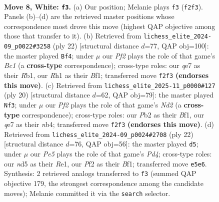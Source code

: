 \documentclass[11pt]{article}
\begin{document}
\begin{figure}[p]\centering
\begin{subfigure}{0.46\textwidth}\centering
\resizebox{\linewidth}{!}{%
\newchessgame
\chessboard[
  setfen={r1b1kb1r/p1ppqppp/2p5/3nP3/8/8/PPP1QPPP/RNB1KB1R w KQkq - 3 8},
  showmover=false,
  pgfstyle=straightmove, color=movearrow, markmove={f2-f3}
]}
\caption{}
\end{subfigure}\hfill
\begin{subfigure}{0.46\textwidth}\centering
\resizebox{\linewidth}{!}{%
\newchessgame
\chessboard[
  setfen={1r2kb1r/pb1pqppp/2n5/2ppP3/8/2P2N2/P1P1QPPP/1RB1KB1R w Kk - 3 12},
  showmover=false,
  pgfstyle=straightmove, color=movearrow, markmove={c1-f4}
]}
\caption{}
\end{subfigure}
\\[4pt]
\begin{subfigure}{0.46\textwidth}\centering
\resizebox{\linewidth}{!}{%
\newchessgame
\chessboard[
  setfen={r1b1kb1r/2ppqppp/2p5/4P3/pnP4P/8/PP1NQPP1/R1B1KB1R w KQkq - 1 11},
  showmover=false,
  pgfstyle=straightmove, color=movearrow, markmove={d2-f3}
]}
\caption{}
\end{subfigure}\hfill
\begin{subfigure}{0.46\textwidth}\centering
\resizebox{\linewidth}{!}{%
\newchessgame
\chessboard[
  setfen={r1bq1rk1/pp1p1ppp/2p2b2/5n2/3P4/2N5/PPP2PPP/R1BQRBK1 w - - 1 12},
  showmover=false,
  pgfstyle=straightmove, color=movearrow, markmove={d4-d5}
]}
\caption{}
\end{subfigure}
\caption{\textbf{Move 8, White: \texttt{f3}.} (a) Our position; Melanie plays \texttt{f3} (\texttt{f2f3}). Panels (b)--(d) are the retrieved master positions whose correspondence most drove this move (highest QAP objective among those that transfer to it). (b) Retrieved from \texttt{lichess\_elite\_2024-09\_p0022\#3258} (ply 22) [structural distance $d$=77, QAP obj=100]: the master played \texttt{Bf4}; under $\mu$ our \emph{Pf2} plays the role of that game's \emph{Bc1} (a \textbf{cross-type} correspondence); cross-type roles: our \emph{q}e7 as their \emph{R}b1, our \emph{R}h1 as their \emph{B}f1; transferred move \texttt{f2f3} \textbf{(endorses this move)}. (c) Retrieved from \texttt{lichess\_elite\_2025-11\_p0000\#127} (ply 20) [structural distance $d$=62, QAP obj=79]: the master played \texttt{Nf3}; under $\mu$ our \emph{Pf2} plays the role of that game's \emph{Nd2} (a \textbf{cross-type} correspondence); cross-type roles: our \emph{P}b2 as their \emph{B}f1, our \emph{q}e7 as their \emph{n}b4; transferred move \texttt{f2f3} \textbf{(endorses this move)}. (d) Retrieved from \texttt{lichess\_elite\_2024-09\_p0024\#2708} (ply 22) [structural distance $d$=76, QAP obj=56]: the master played \texttt{d5}; under $\mu$ our \emph{Pe5} plays the role of that game's \emph{Pd4}; cross-type roles: our \emph{n}d5 as their \emph{R}e1, our \emph{P}f2 as their \emph{B}f1; transferred move \texttt{e5e6}. Synthesis: 2 retrieved analogs transferred to \texttt{f3} (summed QAP objective 179, the strongest correspondence among the candidate moves); Melanie committed it via the \texttt{search} selector.}
\label{fig:thought-m14}
\end{figure}
\end{document}
